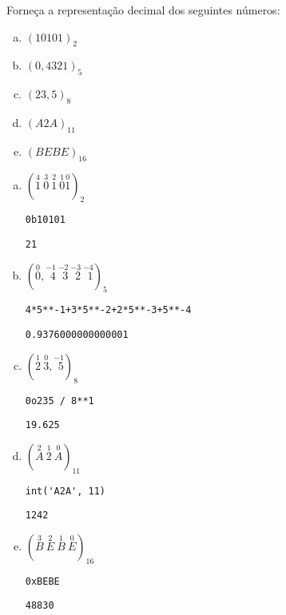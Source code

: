 \begin{exeresol}
  Forneça a representação decimal dos seguintes números:
  \begin{enumerate}[a)]
  \item $(10101)_2$
  \item $(0,4321)_5$
  \item $(23,5)_8$
  \item $(A2A)_{11}$
  \item $(BEBE)_{16}$
  \end{enumerate}
\end{exeresol}
\begin{resol}
  \begin{enumerate}[a)]
  \item $(\stackrel{4}{1}~\stackrel{3}{0}~\stackrel{2}{1}~\stackrel{1}{0}\stackrel{0}{1})_2$

\begin{lstlisting}
0b10101
\end{lstlisting}

\begin{verbatim}
21
\end{verbatim}

  \item $(\stackrel{0}{0},\stackrel{-1}{~\,4}~\stackrel{-2}{~\,3}~\stackrel{-3}{~\,2}~\stackrel{-4}{~\,1})_5$

\begin{lstlisting}
4*5**-1+3*5**-2+2*5**-3+5**-4
\end{lstlisting}

\begin{verbatim}
0.9376000000000001
\end{verbatim}
  
  \item $(\stackrel{1}{2}~\stackrel{0}{3},\stackrel{-1}{~\,5})_8$

\begin{lstlisting}
0o235 / 8**1
\end{lstlisting}

\begin{verbatim}
19.625
\end{verbatim}

  \item $(\stackrel{2}{A}~\stackrel{1}{2}~\stackrel{0}{A})_{11}$

\begin{lstlisting}
int('A2A', 11)
\end{lstlisting}

\begin{verbatim}
1242
\end{verbatim}

  \item $(\stackrel{3}{B}~\stackrel{2}{E}~\stackrel{1}{B}~\stackrel{0}{E})_{16}$

\begin{lstlisting}
0xBEBE
\end{lstlisting}

\begin{verbatim}
48830
\end{verbatim}

  \end{enumerate}
\end{resol}

